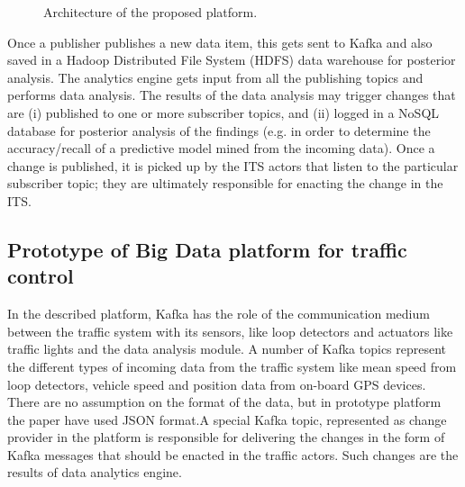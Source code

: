 \documentclass[sigconf]{acmart}
\begin{document}
\begin{figure}[h]
\centering
{}
\caption{Architecture of the proposed platform.}
\label{fig:1}
\end{figure}


Once a publisher publishes a new data item, this gets sent to Kafka and also saved in a Hadoop Distributed File System (HDFS) data warehouse for posterior analysis. The analytics engine gets input from all the publishing topics and performs data analysis. The results of the data analysis may trigger changes that are (i) published to one or more subscriber topics, and (ii) logged in a NoSQL database for posterior analysis of the findings (e.g. in order to determine the accuracy/recall of a predictive model mined from the incoming data). Once a change is published, it is picked up by the ITS actors that listen to the particular subscriber topic; they are ultimately responsible for enacting the change in the ITS.

\subsection{Prototype of Big Data platform for traffic control}

In the described platform, Kafka has the role of the communication medium between the traffic system with its sensors, like loop detectors and actuators like traffic lights and the data analysis module. A number of Kafka topics represent the different types of incoming data from the traffic system like mean speed from loop detectors, vehicle speed and position data from on-board GPS devices. There are no assumption on the format of the data, but in prototype platform the paper have used JSON format.A special Kafka topic, represented as change provider in the platform is responsible for delivering the changes in the form of Kafka messages that should be enacted in the traffic actors. Such changes are the results of data analytics engine.
\end{document}
